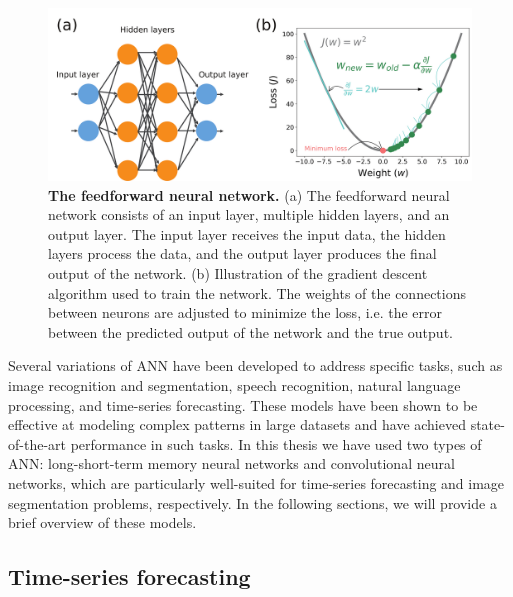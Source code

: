 \begin{figure}[H]
  \centering
  \includegraphics[width=1\textwidth]{Figures/ANN.pdf}
  \caption[The feedforward neural network]{
    \textbf{The feedforward neural network.} (a) The feedforward neural network
    consists of an input layer, multiple hidden layers, and an output layer.
    The input layer receives the input data, the hidden layers process the
    data, and the output layer produces the final output of the network.
    (b) Illustration of the gradient descent algorithm used to train the
    network. The weights of the connections between neurons are adjusted to
    minimize the loss, i.e. the error between the predicted output of the
    network and the true output.}
  \label{fig:ANN}
\end{figure}

Several variations of ANN have been developed to address specific tasks, such
as image recognition and segmentation, speech recognition, natural language
processing, and time-series forecasting. These models have been shown to be
effective at modeling complex patterns in large datasets and have achieved
state-of-the-art performance in such tasks. In this thesis we have used two
types of ANN: long-short-term memory neural networks and convolutional neural
networks, which are particularly well-suited for time-series forecasting and
image segmentation problems, respectively. In the following sections, we will
provide a brief overview of these models.

\subsection{\label{sec:Time-series forecasting} Time-series forecasting}

